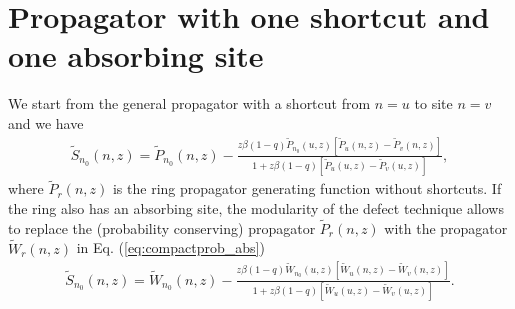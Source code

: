 \documentclass[idelinks, superscriptaddress, amsmath, amssymb, aps, pre]{revtex4-2}
\begin{document}



\section*{Propagator with one shortcut and one absorbing site}

We start from the general propagator with a shortcut from $n=u$ to site $n=v$ and we have
\begin{align}
\widetilde{S}_{n_0}(n,z)=\widetilde{P}_{n_0}(n,z)-\frac{z\beta (1-q)\widetilde{P}_{n_0}(u,z)\left[\widetilde{P}_{u}(n,z)-\widetilde{P}_{v}(n,z)\right]}{1+z\beta(1-q)\left[\widetilde{P}_{u}(u,z)-\widetilde{P}_{v}(u,z)\right]},
\label{eq:one_def_prop}
\end{align}
where $\widetilde{P}_{r}(n,z)$ is the ring propagator generating function without shortcuts. If the ring also has an absorbing site, the modularity of the defect technique allows to replace the (probability conserving) propagator $\widetilde{P}_{r}(n,z)$ with the propagator $\widetilde{W}_{r}(n,z)$ in Eq. (\ref{eq:compactprob_abs})
\begin{align}
\widetilde{S}_{n_0}(n,z)=\widetilde{W}_{n_0}(n,z)-\frac{z\beta (1-q)\widetilde{W}_{n_0}(u,z)\left[\widetilde{W}_{u}(n,z)-\widetilde{W}_{v}(n,z)\right]}{1+z\beta(1-q)\left[\widetilde{W}_{u}(u,z)-\widetilde{W}_{v}(u,z)\right]}.
\label{eq:one_def_prop_abs}
\end{align}
\end{document}
